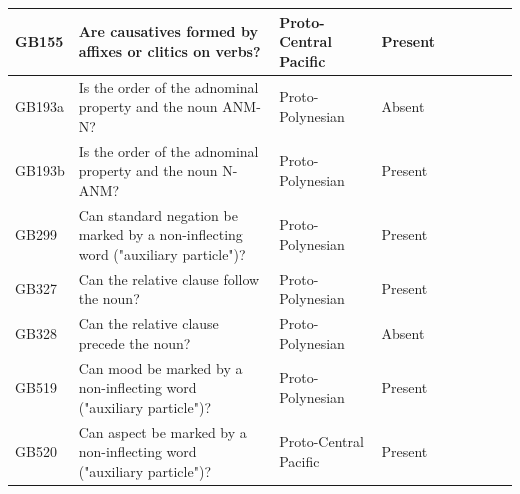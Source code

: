 \documentclass[draft,10pt]{article} %
\begin{document}
\begin{landscape}
\begin{longtable}{| p{2cm}| p{3cm}| p{2.5cm}|p{2cm}|p{2cm}|p{2cm}|p{2cm}|p{2cm}|p{2cm}|}
GB155&Are causatives formed by affixes or clitics on verbs?&Proto-Central Pacific&Present&\citet[352]{pawley1970change}& \cellcolor{hedvig_lightgreen!50}{True Positive} & \cellcolor{hedvig_lightgreen!50}{True Positive} & \cellcolor{hedvig_lightgreen!50}{True Positive} & \cellcolor{hedvig_lightgreen!50}{True Positive} \\ \hline
GB193a&Is the order of the adnominal property and the noun ANM-N?&Proto-Polynesian&Absent&\citet[xiv]{clark1976aspects}& \cellcolor{hedvig_lightgreen!50}{True Negative} & \cellcolor{hedvig_yellow!50}{True Negative} & \cellcolor{hedvig_yellow!50}{True Negative} & \cellcolor{hedvig_yellow!50}{True Negative} \\ \hline
GB193b&Is the order of the adnominal property and the noun N-ANM?&Proto-Polynesian&Present&\citet[495]{ross2004morphosyntactic}& \cellcolor{hedvig_lightgreen!50}{True Positive} & \cellcolor{hedvig_lightgreen!50}{True Positive} & \cellcolor{hedvig_lightgreen!50}{True Positive} & \cellcolor{hedvig_lightgreen!50}{True Positive} \\ \hline
GB299&Can standard negation be marked by a non-inflecting word ("auxiliary particle")?&Proto-Polynesian&Present&\citet[130]{clark1976aspects}& \cellcolor{hedvig_lightgreen!50}{True Positive} & \cellcolor{hedvig_lightgreen!50}{True Positive} & \cellcolor{hedvig_lightgreen!50}{True Positive} & \cellcolor{hedvig_lightgreen!50}{True Positive} \\ \hline
GB327&Can the relative clause follow the noun?&Proto-Polynesian&Present&\citet[74]{clark1976aspects}& \cellcolor{hedvig_lightgreen!50}{True Positive} & \cellcolor{hedvig_lightgreen!50}{True Positive} & \cellcolor{hedvig_lightgreen!50}{True Positive} & \cellcolor{hedvig_lightgreen!50}{True Positive} \\ \hline
GB328&Can the relative clause precede the noun?&Proto-Polynesian&Absent&\citet[74]{clark1976aspects}& \cellcolor{hedvig_lightgreen!50}{True Negative} & \cellcolor{hedvig_yellow!50}{True Negative} & \cellcolor{hedvig_yellow!50}{True Negative} & \cellcolor{hedvig_yellow!50}{True Negative} \\ \hline
GB519&Can mood be marked by a non-inflecting word ("auxiliary particle")?&Proto-Polynesian&Present&\citet[20]{chung1978}& \cellcolor{hedvig_lightgreen!50}{True Positive} & \cellcolor{hedvig_lightgreen!50}{True Positive} & \cellcolor{hedvig_lightgreen!50}{True Positive} & \cellcolor{hedvig_lightgreen!50}{True Positive} \\ \hline
GB520&Can aspect be marked by a non-inflecting word ("auxiliary particle")?&Proto-Central Pacific&Present&\citet[347]{pawley1970change}& \cellcolor{hedvig_lightgreen!50}{True Positive} & \cellcolor{hedvig_lightgreen!50}{True Positive} & \cellcolor{hedvig_lightgreen!50}{True Positive} & \cellcolor{hedvig_lightgreen!50}{True Positive} \\ \hline

\end{longtable}
\end{landscape}
\end{document}
